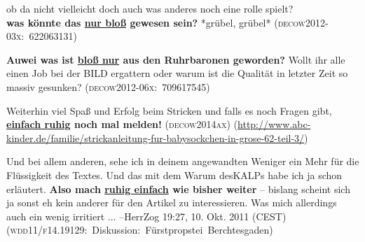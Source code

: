 \begin{exe}
	\ex\label{1197} 
		\begin{xlist}	
			\ex\label{1197a} 
		 
			{ob da nicht vielleicht doch auch was anderes noch eine rolle spielt?\\
			\textbf{was könnte das \underline{nur bloß} gewesen sein?} *grübel, grübel*
			\newline\hbox{}\hfill\hbox{\scshape(decow2012-03x: 622063131)}}
			\ex\label{1197b} 
		 
			{\textbf{Auwei was ist \underline{bloß nur} aus den Ruhrbaronen geworden?} Wollt ihr alle einen Job bei der BILD ergattern oder warum ist die Qualität in letzter Zeit so massiv gesunken?      
			\hfill\hbox{\scshape(decow2012-06x: 709617545)}
			\newline
			\hbox{}\hfill\hbox{\citet[14]{Mueller2014b}}}
		\end{xlist}
\end{exe}		  										         
\largerpage[-1]
\begin{exe}
	\ex\label{1198} 
		\begin{xlist}
			\ex\label{1198a} 
		 
			{Weiterhin viel Spaß und Erfolg beim Stricken und falls es noch Fragen gibt, \textbf{\underline{einfach ruhig} noch mal melden!}	
			\hfill\hbox{\scshape(decow2014ax)}			
			\newline
			\hbox{}\hfill{\scriptsize(\url{http://www.abc-kinder.de/familie/strickanleitung-fur-babysockchen-in-grose-62-teil-3/})}}
			
			\ex\label{1198b} 
		 
			{Und bei allem anderen, sehe ich in deinem angewandten Weniger ein Mehr für die Flüssigkeit des Textes. Und das mit dem Warum des\linebreak KALPs habe 				ich ja schon erläutert. \textbf{Also mach \underline{ruhig einfach} wie bisher weiter} – bislang scheint sich ja sonst eh kein anderer für den 				Artikel zu interessieren. Was mich allerdings auch ein wenig irritiert ... --HerrZog 19:27, 10. Okt. 2011 (CEST)	     
			\newline
			\hbox{}\hfill\hbox{(\textsc{wdd11/f14.19129}: Diskussion: Fürstpropstei Berchtesgaden)}}
		\end{xlist}
\end{exe}	

